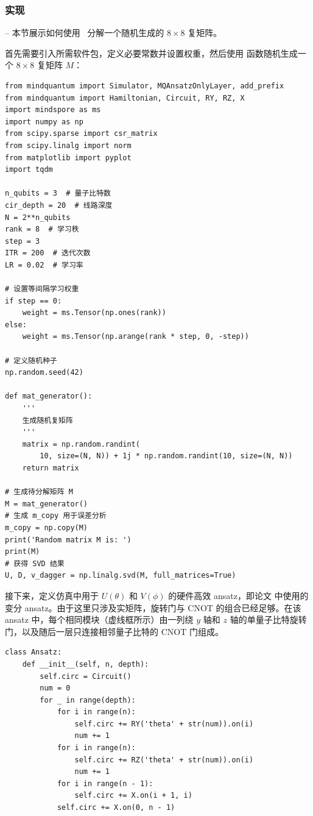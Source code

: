 \subsubsection{实现} -- 本节展示如何使用 \MindQuantum\ 分解一个随机生成的 $8 \times 8$ 复矩阵。

首先需要引入所需软件包，定义必要常数并设置权重，然后使用  函数随机生成一个 $8 \times 8$ 复矩阵 $M$：
\begin{lstlisting}
from mindquantum import Simulator, MQAnsatzOnlyLayer, add_prefix
from mindquantum import Hamiltonian, Circuit, RY, RZ, X
import mindspore as ms
import numpy as np
from scipy.sparse import csr_matrix
from scipy.linalg import norm
from matplotlib import pyplot
import tqdm

n_qubits = 3  # 量子比特数
cir_depth = 20  # 线路深度
N = 2**n_qubits
rank = 8  # 学习秩
step = 3
ITR = 200  # 迭代次数
LR = 0.02  # 学习率

# 设置等间隔学习权重
if step == 0:
    weight = ms.Tensor(np.ones(rank))
else:
    weight = ms.Tensor(np.arange(rank * step, 0, -step))

# 定义随机种子
np.random.seed(42)

def mat_generator():
    '''
    生成随机复矩阵
    '''
    matrix = np.random.randint(
        10, size=(N, N)) + 1j * np.random.randint(10, size=(N, N))
    return matrix

# 生成待分解矩阵 M
M = mat_generator()
# 生成 m_copy 用于误差分析
m_copy = np.copy(M)
print('Random matrix M is: ')
print(M)
# 获得 SVD 结果
U, D, v_dagger = np.linalg.svd(M, full_matrices=True)
\end{lstlisting}

接下来，定义仿真中用于 $U(\theta)$ 和 $V(\phi)$ 的硬件高效 ansatz，即论文 \cite{wang2021variational} 中使用的变分 ansatz。由于这里只涉及实矩阵，旋转门与 CNOT 的组合已经足够。在该 ansatz 中，每个相同模块（虚线框所示）由一列绕 $y$ 轴和 $z$ 轴的单量子比特旋转门，以及随后一层只连接相邻量子比特的 CNOT 门组成。
\begin{lstlisting}
class Ansatz:
    def __init__(self, n, depth):
        self.circ = Circuit()
        num = 0
        for _ in range(depth):
            for i in range(n):
                self.circ += RY('theta' + str(num)).on(i)
                num += 1
            for i in range(n):
                self.circ += RZ('theta' + str(num)).on(i)
                num += 1
            for i in range(n - 1):
                self.circ += X.on(i + 1, i)
            self.circ += X.on(0, n - 1)
\end{lstlisting}

